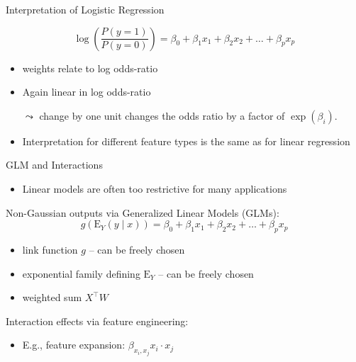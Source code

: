 \documentclass[11pt,compress,t,notes=noshow, aspectratio=169, xcolor=table]{beamer}
\begin{document}

\begin{frame}[c]{Interpretation of Logistic Regression}

    $$\log \left(\frac{P(y = 1)}{P(y=0)}\right) = \beta_0 + \beta_1 x_1 + \beta_2 x_2 + \ldots + \beta_p x_p  $$

    \begin{itemize}
        \item weights relate to log odds-ratio
        \item Again linear in log odds-ratio
        \item[$\leadsto$] change by one unit changes the odds ratio by a \alert{factor} of $\exp(\beta_i)$.
        \medskip
        \pause
        \item Interpretation for different feature types is the same as for linear regression
    \end{itemize}	

\end{frame}


\begin{frame}{GLM and Interactions}

    \begin{itemize}
        \item Linear models are often too restrictive for many applications
    \end{itemize}
    
    \medskip
    Non-Gaussian outputs via Generalized Linear Models (GLMs):
    $$g(\mathrm{E}_Y (y\mid x)) = \beta_0 + \beta_1 x_1 + \beta_2 x_2 + \ldots + \beta_p x_p$$
    \begin{itemize}
        \item link function $g$ -- can be freely chosen
        \item exponential family defining $\mathrm{E}_Y$ -- can be freely chosen
        \item weighted sum $X^\top W$
    \end{itemize}
    
    \medskip 
    \pause
    Interaction effects via feature engineering:
    \begin{itemize}
        \item E.g., feature expansion: $\beta_{x_i,x_j} x_i \cdot x_j$
    \end{itemize}
    
\end{frame}
\end{document}
